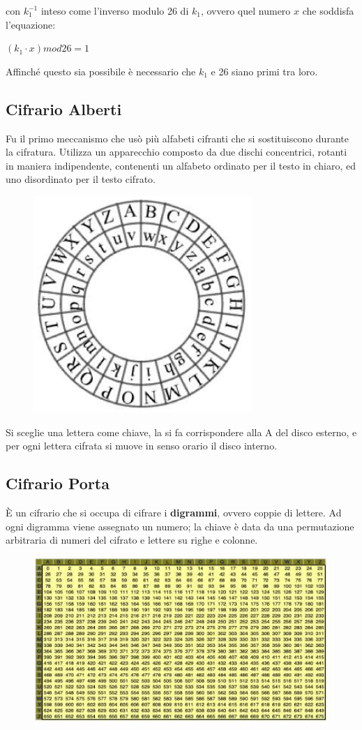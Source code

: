 \noindent con $k_1^{-1}$ inteso come l'inverso modulo 26 di $k_1$, ovvero quel numero 
$x$ che soddisfa l'equazione:

\begin{center}
    $(k_1 \cdot x) mod 26 = 1$
\end{center}

\noindent Affinché questo sia possibile è necessario che $k_1$ e 26 siano primi tra loro.


\subsection{Cifrario Alberti}
Fu il primo meccanismo che usò più alfabeti cifranti che si sostituiscono durante la cifratura. Utilizza un apparecchio composto 
da due dischi concentrici, rotanti in maniera indipendente, contenenti un alfabeto ordinato per il testo in chiaro, ed uno disordinato per 
il testo cifrato.

\begin{figure}[H]
    \centering
    \includegraphics[width=0.4\linewidth]{chapters/chap2/images/disco.png}
\end{figure}

\noindent Si sceglie una lettera come chiave, la si fa corrispondere alla A del disco esterno, e per ogni lettera cifrata si muove 
in senso orario il disco interno.

\subsection{Cifrario Porta}

È un cifrario che si occupa di cifrare i \textbf{digrammi}, ovvero coppie di lettere. Ad ogni digramma viene assegnato un numero; la chiave 
è data da una permutazione arbitraria di numeri del cifrato e lettere su righe e colonne.

\begin{figure}[H]
    \centering
    \includegraphics[width=0.8\linewidth]{chapters/chap2/images/porta.png}
\end{figure}

